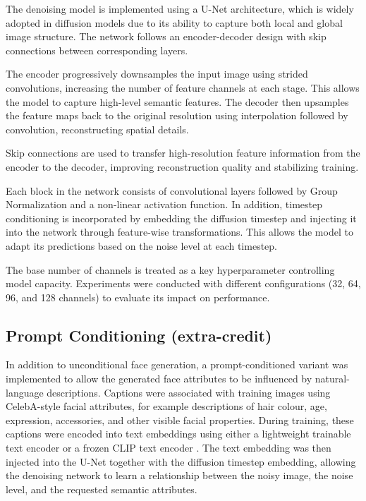 \documentclass[conference]{IEEEtran}
\begin{document}
The denoising model is implemented using a U-Net architecture, which is widely adopted in diffusion models due to its ability to capture both local and global image structure. The network follows an encoder-decoder design with skip connections between corresponding layers.

The encoder progressively downsamples the input image using strided convolutions, increasing the number of feature channels at each stage. This allows the model to capture high-level semantic features. The decoder then upsamples the feature maps back to the original resolution using interpolation followed by convolution, reconstructing spatial details.

Skip connections are used to transfer high-resolution feature information from the encoder to the decoder, improving reconstruction quality and stabilizing training.

Each block in the network consists of convolutional layers followed by Group Normalization and a non-linear activation function. In addition, timestep conditioning is incorporated by embedding the diffusion timestep and injecting it into the network through feature-wise transformations. This allows the model to adapt its predictions based on the noise level at each timestep.

The base number of channels is treated as a key hyperparameter controlling model capacity. Experiments were conducted with different configurations (32, 64, 96, and 128 channels) to evaluate its impact on performance.

\subsection{Prompt Conditioning (extra-credit)}

In addition to unconditional face generation, a prompt-conditioned variant was implemented to allow the generated face attributes to be influenced by natural-language descriptions. Captions were associated with training images using CelebA-style facial attributes, for example descriptions of hair colour, age, expression, accessories, and other visible facial properties. During training, these captions were encoded into text embeddings using either a lightweight trainable text encoder or a frozen CLIP text encoder \cite{b8}. The text embedding was then injected into the U-Net together with the diffusion timestep embedding, allowing the denoising network to learn a relationship between the noisy image, the noise level, and the requested semantic attributes.
\end{document}
